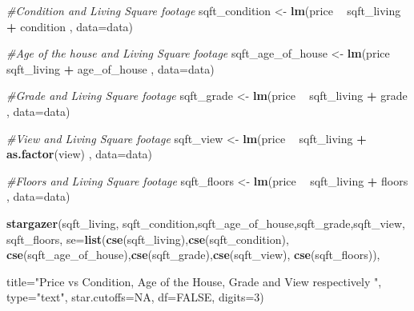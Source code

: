 \documentclass[
]{article}
\newenvironment{Shaded}{\begin{snugshade}}{\end{snugshade}}
\newcommand{\CommentTok}[1]{\textcolor[rgb]{0.56,0.35,0.01}{\textit{#1}}}
\newcommand{\DataTypeTok}[1]{\textcolor[rgb]{0.13,0.29,0.53}{#1}}
\newcommand{\DecValTok}[1]{\textcolor[rgb]{0.00,0.00,0.81}{#1}}
\newcommand{\KeywordTok}[1]{\textcolor[rgb]{0.13,0.29,0.53}{\textbf{#1}}}
\newcommand{\NormalTok}[1]{#1}
\newcommand{\OperatorTok}[1]{\textcolor[rgb]{0.81,0.36,0.00}{\textbf{#1}}}
\newcommand{\OtherTok}[1]{\textcolor[rgb]{0.56,0.35,0.01}{#1}}
\newcommand{\StringTok}[1]{\textcolor[rgb]{0.31,0.60,0.02}{#1}}
\begin{document}
\begin{Shaded}
\begin{Highlighting}[]
\CommentTok{#Condition and Living Square footage}
\NormalTok{sqft_condition <-}\StringTok{  }\KeywordTok{lm}\NormalTok{(price }\OperatorTok{~}\StringTok{ }\NormalTok{sqft_living }\OperatorTok{+}\StringTok{ }\NormalTok{condition , }\DataTypeTok{data=}\NormalTok{data)}

\CommentTok{#Age of the house and Living Square footage}
\NormalTok{sqft_age_of_house <-}\StringTok{  }\KeywordTok{lm}\NormalTok{(price }\OperatorTok{~}\StringTok{ }\NormalTok{sqft_living }\OperatorTok{+}\StringTok{ }\NormalTok{age_of_house , }\DataTypeTok{data=}\NormalTok{data)}

\CommentTok{#Grade and Living Square footage}
\NormalTok{sqft_grade <-}\StringTok{  }\KeywordTok{lm}\NormalTok{(price }\OperatorTok{~}\StringTok{ }\NormalTok{sqft_living }\OperatorTok{+}\StringTok{ }\NormalTok{grade , }\DataTypeTok{data=}\NormalTok{data)}

\CommentTok{#View and Living Square footage}
\NormalTok{sqft_view <-}\StringTok{  }\KeywordTok{lm}\NormalTok{(price }\OperatorTok{~}\StringTok{ }\NormalTok{sqft_living }\OperatorTok{+}\StringTok{ }\KeywordTok{as.factor}\NormalTok{(view) , }\DataTypeTok{data=}\NormalTok{data)}

\CommentTok{#Floors and Living Square footage}
\NormalTok{sqft_floors <-}\StringTok{  }\KeywordTok{lm}\NormalTok{(price }\OperatorTok{~}\StringTok{ }\NormalTok{sqft_living }\OperatorTok{+}\StringTok{ }\NormalTok{floors , }\DataTypeTok{data=}\NormalTok{data)}


\KeywordTok{stargazer}\NormalTok{(sqft_living, sqft_condition,sqft_age_of_house,sqft_grade,sqft_view, sqft_floors,  }\DataTypeTok{se=}\KeywordTok{list}\NormalTok{(}\KeywordTok{cse}\NormalTok{(sqft_living),}\KeywordTok{cse}\NormalTok{(sqft_condition), }\KeywordTok{cse}\NormalTok{(sqft_age_of_house),}\KeywordTok{cse}\NormalTok{(sqft_grade),}\KeywordTok{cse}\NormalTok{(sqft_view), }\KeywordTok{cse}\NormalTok{(sqft_floors)),}

                     \DataTypeTok{title=}\StringTok{"Price vs Condition, Age of the House, Grade and View respectively "}\NormalTok{, }\DataTypeTok{type=}\StringTok{"text"}\NormalTok{, }\DataTypeTok{star.cutoffs=}\OtherTok{NA}\NormalTok{, }\DataTypeTok{df=}\OtherTok{FALSE}\NormalTok{, }\DataTypeTok{digits=}\DecValTok{3}\NormalTok{)}
\end{Highlighting}
\end{Shaded}
\end{document}
